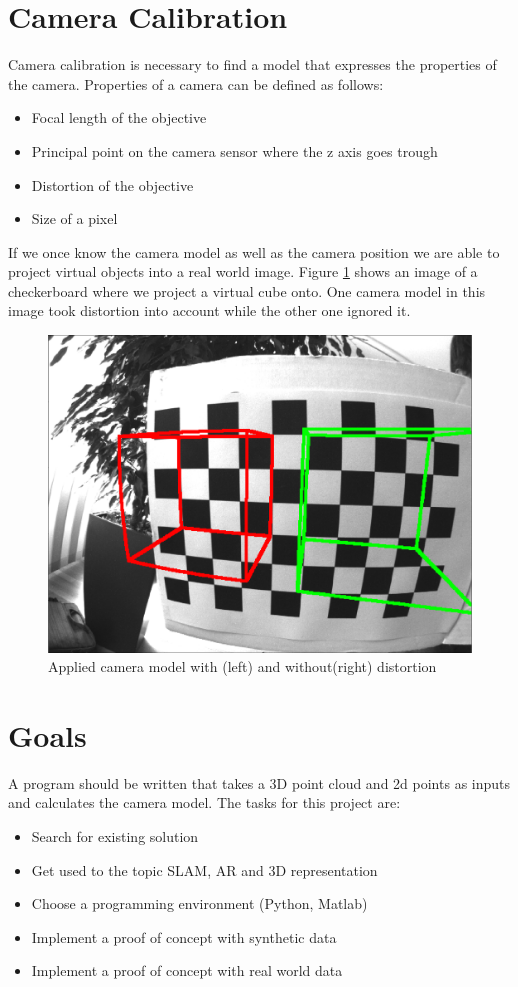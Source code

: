 \documentclass[11pt,a4paper,titlepage,oneside]{report}
\begin{document}
\section{Camera Calibration}\label{sec:calibration}
Camera calibration is necessary to find a model that expresses the properties of the camera. Properties of a camera can be defined as follows:
\begin{itemize}
	\item Focal length of the objective
	\item Principal point on the camera sensor where the z axis goes trough
	\item Distortion of the objective
	\item Size of a pixel
\end{itemize}
If we once know the camera model as well as the camera position we are able to project virtual objects into a real world image. Figure \ref{fig:model} shows an image of a checkerboard where we project a virtual cube onto. One camera model in this image took distortion into account while the other one ignored it.
\begin{figure}[H]
  \begin{center}
		\includegraphics[width=1.0\textwidth]{img/model.png}
  \end{center}
	\caption{Applied camera model with (left) and without(right) distortion}\label{fig:model}
\end{figure}

\section{Goals}
A program should be written that takes a 3D point cloud and 2d points as inputs and calculates the camera model. The tasks for this project are:
\begin{itemize}
\item Search for existing solution
\item Get used to the topic SLAM, AR and 3D representation
\item Choose a programming environment (Python, Matlab)
\item Implement a proof of concept with synthetic data
\item Implement a proof of concept with real world data
\end{itemize}
\end{document}

